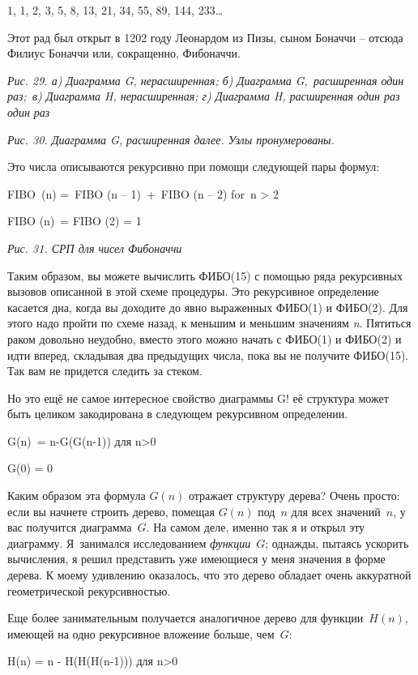 \documentclass[../main.tex]{subfiles}
\begin{document}
1, 1, 2, 3, 5, 8, 13, 21, 34, 55, 89, 144, 233\ldots{}

Этот рад был открыт в 1202 году Леонардом из Пизы, сыном Боначчи \--- отсюда Филиус Боначчи или, сокращенно, Фибоначчи.

\emph{Рис. 29. а) Диаграмма G, нерасширенная; б) Диаграмма G,~расширенная один раз;~в) Диаграмма H, нерасширенная; г) Диаграмма H, расширенная один раз один раз}

\emph{Рис. 30. Диаграмма G, расширенная далее. Узлы пронумерованы.}

Это числа описываются рекурсивно при помощи следующей пары формул:

FIBO~(n) =~FIBO (n \--- 1)~+~FIBO (n \--- 2) for~n \textgreater{} 2

FIBO (n)~= FIBO (2) = 1

\emph{Рис. 31. СРП для чисел Фибоначчи}

Таким образом, вы можете вычислить ФИБО(15) с помощью ряда рекурсивных вызовов описанной в этой схеме процедуры. Это рекурсивное определение касается дна, когда вы доходите до явно выраженных ФИБО(1) и ФИБО(2). Для этого надо пройти по схеме назад, к меньшим и меньшим значениям \emph{n}. Пятиться раком довольно неудобно, вместо этого можно начать с ФИБО(1) и ФИБО(2) и идти вперед, складывая два предыдущих числа, пока вы не получите ФИБО(15). Так вам не придется следить за стеком.

Но это ещё не самое интересное свойство диаграммы G! её структура может быть целиком закодирована в следующем рекурсивном определении.

G(n)~= n-G(G(n-1)) для n\textgreater0

G(0) = 0

Каким образом эта формула $G(n)$ отражает структуру дерева? Очень просто: если вы начнете строить дерево, помещая $G(n)$ под~$n$ для всех значений~$n$, у вас получится диаграмма~$G$. На самом деле, именно так я и открыл эту диаграмму. Я~занимался исследованием \emph{функции}~$G$; однажды, пытаясь ускорить вычисления, я решил представить уже имеющиеся у меня значения в форме дерева. К моему удивлению оказалось, что это дерево обладает очень аккуратной геометрической рекурсивностью.

Еще более занимательным получается аналогичное дерево для функции~$H(n)$, имеющей на одно рекурсивное вложение больше, чем~$G$:

H(n) = n - H(H(H(n-1))) для n\textgreater0
\end{document}
